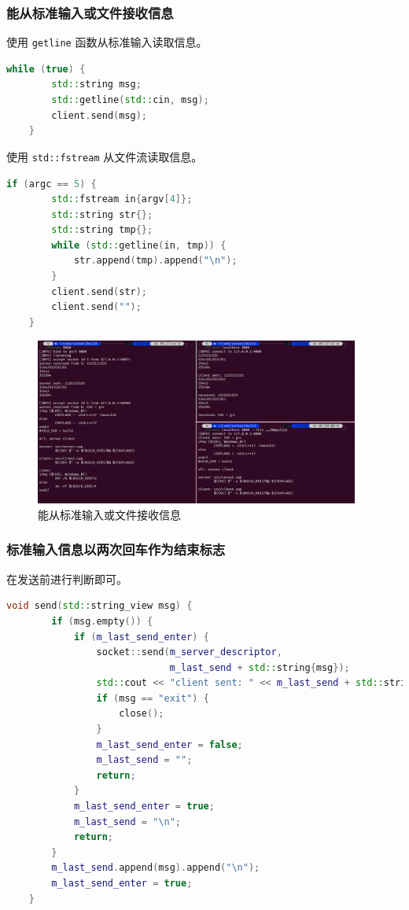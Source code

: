 \documentclass{article}
\begin{document}
\subsubsection{能从标准输入或文件接收信息}

使用 \texttt{getline} 函数从标准输入读取信息。

\begin{lstlisting}[language=C++]
    while (true) {
        std::string msg;
        std::getline(std::cin, msg);
        client.send(msg);
    }
\end{lstlisting}

使用 \texttt{std::fstream} 从文件流读取信息。

\begin{lstlisting}[language=C++]
    if (argc == 5) {
        std::fstream in{argv[4]};
        std::string str{};
        std::string tmp{};
        while (std::getline(in, tmp)) {
            str.append(tmp).append("\n");
        }
        client.send(str);
        client.send("");
    }
\end{lstlisting}

\begin{figure}[H]
    \centering
    \includegraphics[width=0.95\textwidth]{img/4.png}
    \caption{能从标准输入或文件接收信息}
\end{figure}

\subsubsection{标准输入信息以两次回车作为结束标志}

在发送前进行判断即可。

\begin{lstlisting}[language=C++]
    void send(std::string_view msg) {
        if (msg.empty()) {
            if (m_last_send_enter) {
                socket::send(m_server_descriptor,
                             m_last_send + std::string{msg});
                std::cout << "client sent: " << m_last_send + std::string{msg} << std::endl;
                if (msg == "exit") {
                    close();
                }
                m_last_send_enter = false;
                m_last_send = "";
                return;
            }
            m_last_send_enter = true;
            m_last_send = "\n";
            return;
        }
        m_last_send.append(msg).append("\n");
        m_last_send_enter = true;
    }
\end{lstlisting}
\end{document}
